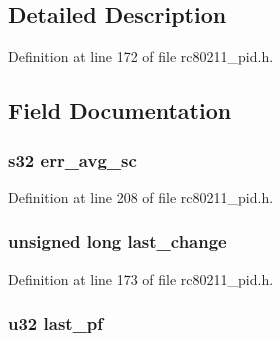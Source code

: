 \subsection{Detailed Description}


Definition at line 172 of file rc80211\-\_\-pid.\-h.



\subsection{Field Documentation}
\hypertarget{structrc__pid__sta__info_ae03bdf9e307543490d3e9f8ebdbee20c}{
\subsubsection[{err\-\_\-avg\-\_\-sc}]{\setlength{\rightskip}{0pt plus 5cm}s32 err\-\_\-avg\-\_\-sc}}\label{structrc__pid__sta__info_ae03bdf9e307543490d3e9f8ebdbee20c}


Definition at line 208 of file rc80211\-\_\-pid.\-h.

\hypertarget{structrc__pid__sta__info_a53675e28c7dd04fd5fb2e66dee8f484f}{
\subsubsection[{last\-\_\-change}]{\setlength{\rightskip}{0pt plus 5cm}unsigned long last\-\_\-change}}\label{structrc__pid__sta__info_a53675e28c7dd04fd5fb2e66dee8f484f}


Definition at line 173 of file rc80211\-\_\-pid.\-h.

\hypertarget{structrc__pid__sta__info_a30bbb3456871e78410e2145cbb670201}{
\subsubsection[{last\-\_\-pf}]{\setlength{\rightskip}{0pt plus 5cm}u32 last\-\_\-pf}}\label{structrc__pid__sta__info_a30bbb3456871e78410e2145cbb670201}


